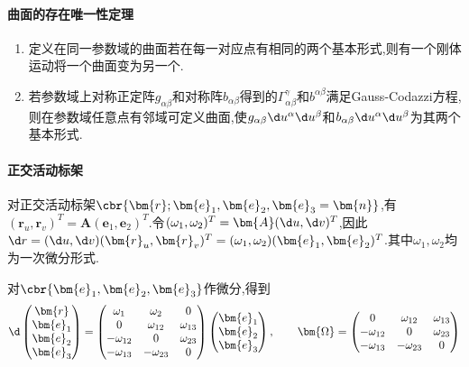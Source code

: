 \documentclass{article}
\begin{document}
\paragraph{曲面的存在唯一性定理}
\begin{enumerate}
    \item 定义在同一参数域的曲面若在每一对应点有相同的两个基本形式,则有一个刚体运动将一个曲面变为另一个.
    \item 若参数域上对称正定阵$g_{\alpha\beta}$和对称阵$b_{\alpha\beta}$得到的$\Gamma^\gamma_{\alpha\beta}$和$b^{\alpha\beta}$满足Gauss-Codazzi方程,则在参数域任意点有邻域可定义曲面,使$g_{\alpha\beta}\d u^\alpha\d u^\beta$和$b_{\alpha\beta}\d u^\alpha\d u^\beta$为其两个基本形式.
\end{enumerate}

\paragraph{正交活动标架}
对正交活动标架$\cbr{\bm{r};\bm{e}_1,\bm{e}_2,\bm{e}_3=\bm{n}}$,有$(\bm{r}_u,\bm{r}_v)^T=\bm{A}(\bm{e}_1,\bm{e}_2)^T$.令$(\omega_1,\omega_2)^T=\bm{A}(\d u,\d v)^T$,因此$\d r=(\d u,\d v)(\bm{r}_u,\bm{r}_v)^T=(\omega_1,\omega_2)(\bm{e}_1,\bm{e}_2)^T$.其中$\omega_1,\omega_2$均为一次微分形式.

对$\cbr{\bm{e}_1,\bm{e}_2,\bm{e}_3}$作微分,得到
$$\d\begin{pmatrix}
    \bm{r}\\\bm{e}_1\\\bm{e}_2\\\bm{e}_3
\end{pmatrix}=\begin{pmatrix}
    \omega_1&\omega_2&0\\
    0&\omega_{12}&\omega_{13}\\
    -\omega_{12}&0&\omega_{23}\\
    -\omega_{13}&-\omega_{23}&0
\end{pmatrix}\begin{pmatrix}
    \bm{e}_1\\\bm{e}_2\\\bm{e}_3
\end{pmatrix},\qquad \bm{\Omega}=\begin{pmatrix}
    0&\omega_{12}&\omega_{13}\\
    -\omega_{12}&0&\omega_{23}\\
    -\omega_{13}&-\omega_{23}&0
\end{pmatrix}$$
\end{document}

